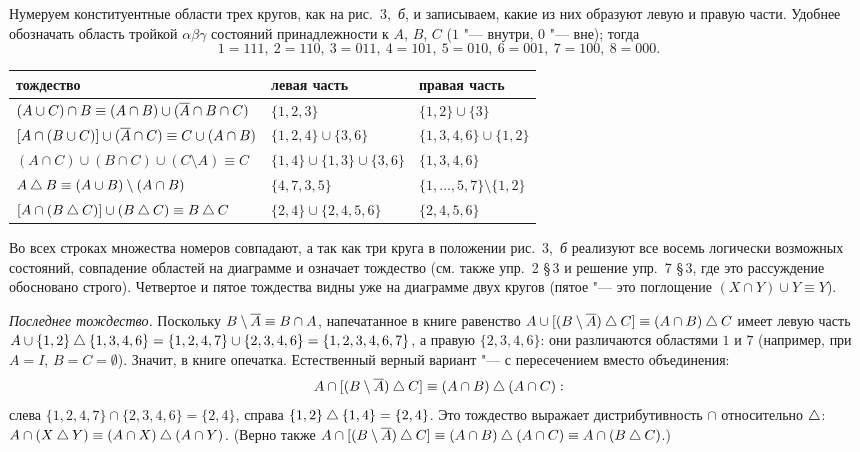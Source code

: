 \begin{solution}[1 (\S\,2)]
Нумеруем конституентные области трех кругов, как на рис.~3,~\emph{б},
и записываем, какие из них образуют левую и правую части. Удобнее
обозначать область тройкой $\alpha\beta\gamma$ состояний принадлежности
к $A$, $B$, $C$ ($1$ "--- внутри, $0$ "--- вне); тогда
\[
1=111,\ 2=110,\ 3=011,\ 4=101,\ 5=010,\ 6=001,\ 7=100,\ 8=000 .
\]
\begin{center}\small
\begin{tabular}{lll}
\toprule
тождество & левая часть & правая часть\\
\midrule
$(A\cup C)\cap B\equiv(A\cap B)\cup(\overline{A}\cap B\cap C)$ & $\{1,2,3\}$ & $\{1,2\}\cup\{3\}$\\
$[A\cap(B\cup C)]\cup(\overline{A}\cap C)\equiv C\cup(A\cap B)$ & $\{1,2,4\}\cup\{3,6\}$ & $\{1,3,4,6\}\cup\{1,2\}$\\
$(A\cap C)\cup(B\cap C)\cup(C\setminus A)\equiv C$ & $\{1,4\}\cup\{1,3\}\cup\{3,6\}$ & $\{1,3,4,6\}$\\
$A\mathbin{\triangle} B\equiv(A\cup B)\setminus(A\cap B)$ & $\{4,7,3,5\}$ & $\{1,\dots,5,7\}\setminus\{1,2\}$\\
$[A\cap(B\mathbin{\triangle} C)]\cup(B\mathbin{\triangle} C)\equiv B\mathbin{\triangle} C$ & $\{2,4\}\cup\{2,4,5,6\}$ & $\{2,4,5,6\}$\\
\bottomrule
\end{tabular}
\end{center}
Во всех строках множества номеров совпадают, а так как три круга
в положении рис.~3,~\emph{б} реализуют все восемь логически возможных
состояний, совпадение областей на диаграмме и означает тождество
(см. также упр.~2 \S\,3 и решение упр.~7 \S\,3, где это рассуждение
обосновано строго). Четвертое и пятое тождества видны уже на диаграмме
двух кругов (пятое "--- это поглощение $(X\cap Y)\cup Y\equiv Y$).

\emph{Последнее тождество.} Поскольку $B\setminus\overline{A}\equiv B\cap A$,
напечатанное в книге равенство
$A\cup[(B\setminus\overline{A})\mathbin{\triangle} C]\equiv(A\cap B)\mathbin{\triangle} C$ имеет левую часть
$A\cup\{1,2\}\mathbin{\triangle}\{1,3,4,6\}=\{1,2,4,7\}\cup\{2,3,4,6\}=\{1,2,3,4,6,7\}$,
а правую $\{2,3,4,6\}$: они различаются областями $1$ и $7$ (например, при
$A=I$, $B=C=\emptyset$). Значит, в книге опечатка. Естественный
верный вариант "--- с пересечением вместо объединения:
\[
A\cap[(B\setminus\overline{A})\mathbin{\triangle} C]\equiv(A\cap B)\mathbin{\triangle}(A\cap C):
\]
слева $\{1,2,4,7\}\cap\{2,3,4,6\}=\{2,4\}$, справа
$\{1,2\}\mathbin{\triangle}\{1,4\}=\{2,4\}$. Это тождество выражает
дистрибутивность $\cap$ относительно $\mathbin{\triangle}$:
$A\cap(X\mathbin{\triangle} Y)\equiv(A\cap X)\mathbin{\triangle}(A\cap Y)$. (Верно также
$A\cap[(B\setminus\overline{A})\mathbin{\triangle} C]\equiv(A\cap B)\mathbin{\triangle}(A\cap C)\equiv A\cap(B\mathbin{\triangle} C)$.)
\end{solution}

